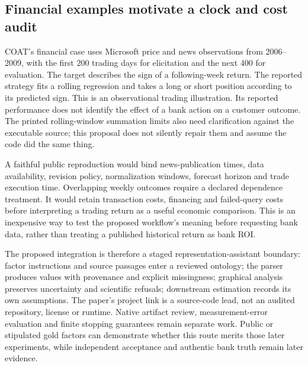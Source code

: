 \subsection{Financial examples motivate a clock and cost audit}
\label{exec19:coat-finance}
COAT's financial case uses Microsoft price and news observations from
2006--2009, with the first 200 trading days for elicitation and the next 400
for evaluation. The target describes the sign of a following-week return.
The reported strategy fits a rolling regression and takes a long or short
position according to its predicted sign. This is an observational trading
illustration. Its reported performance does not identify the effect of a bank
action on a customer outcome. The printed rolling-window summation limits
also need clarification against the executable source; this proposal does not
silently repair them and assume the code did the same thing.\citep{exec19_coat}

A faithful public reproduction would bind news-publication times, data
availability, revision policy, normalization windows, forecast horizon and
trade execution time. Overlapping weekly outcomes require a declared
dependence treatment. It would retain transaction costs, financing and
failed-query costs before interpreting a trading return as a useful economic
comparison. This is an inexpensive way to test the proposed workflow's
meaning before requesting bank data, rather than treating a published
historical return as bank ROI.

The proposed integration is therefore a staged representation-assistant
boundary: factor instructions and source passages enter a reviewed ontology;
the parser produces values with provenance and explicit missingness; graphical
analysis preserves uncertainty and scientific refusals; downstream estimation
records its own assumptions. The paper's project link is a source-code lead,
not an audited repository, license or runtime. Native artifact review,
measurement-error evaluation and finite stopping guarantees remain separate
work. Public or stipulated gold factors can demonstrate whether this route
merits those later experiments, while independent acceptance and authentic
bank truth remain later evidence.\citep{exec19_coat,exec19_coat_reference}
